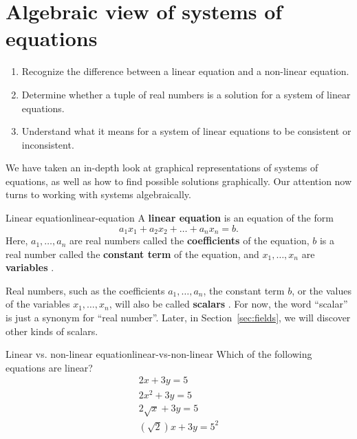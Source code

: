 \section{Algebraic view of systems of equations}

\begin{outcome}
  \begin{enumerate}
  \item Recognize the difference between a linear equation and a
    non-linear equation.
  \item Determine whether a tuple of real numbers is a solution for a
    system of linear equations.
  \item Understand what it means for a system of linear equations to
    be consistent or inconsistent.
  \end{enumerate}
\end{outcome}

We have taken an in-depth look at graphical representations of systems
of equations, as well as how to find possible solutions
graphically. Our attention now turns to working with systems
algebraically.

\begin{definition}{Linear equation}{linear-equation}
  A \textbf{linear equation}%
   is an equation of the form
  \begin{equation*}
    a_1x_1 + a_2x_2 + \ldots + a_nx_n = b.
  \end{equation*}
  Here, $a_1,\ldots,a_n$ are real numbers called the
  \textbf{coefficients}%
   of the equation, $b$ is a real number called the
  \textbf{constant term}%
   of the equation, and $x_1,\ldots,x_n$ are
  \textbf{variables}%
  .
\end{definition}

Real numbers, such as the coefficients $a_1,\ldots,a_n$, the constant
term $b$, or the values of the variables $x_1,\ldots,x_n$, will also
be called \textbf{scalars}%
. For now, the word ``scalar'' is just a synonym for
``real number''. Later, in Section~\ref{sec:fields}, we will discover
other kinds of scalars.

\begin{example}{Linear vs. non-linear equation}{linear-vs-non-linear}
  Which of the following equations are linear?
  \begin{equation*}
    \begin{array}{c}
      2x+3y=5 \\
      2x^2+3y=5 \\
      2\sqrt{x} + 3y = 5 \\
      (\sqrt{2}) x + 3y = 5^2
    \end{array}
  \end{equation*}
\end{example}

